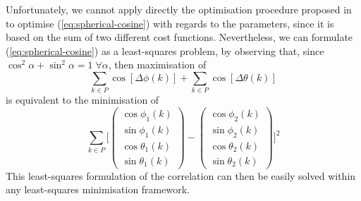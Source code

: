Unfortunately, we cannot apply directly the optimisation procedure proposed in \cite{RefWorks:6} to optimise (\ref{eq:spherical-cosine}) with regards to the parameters, since it is based on the sum of two different cost functions. Nevertheless, we can formulate (\ref{eq:spherical-cosine}) as a least-squares problem, by observing that, since $\cos^2 \alpha + \sin^2 \alpha = 1 \; \forall \alpha$, then maximisation of
\begin{equation}\label{eq:maximise-cos}
   \sum_{k \in P} \cos [\Delta \phi (k)] + \sum_{k \in P} \cos [\Delta \theta (k)]
\end{equation}
is equivalent to the minimisation of
\begin{equation}\label{eq:minimise-least-squares}
       \sum_{k \in P} \Big[ 
        \begin{pmatrix}
            \cos \phi_1 (k) \\ 
            \sin \phi_1 (k) \\
            \cos \theta_1 (k) \\ 
            \sin \theta_1 (k)
        \end{pmatrix}
        -
        \begin{pmatrix}
            \cos \phi_2 (k) \\ 
            \sin \phi_2 (k) \\
            \cos \theta_2 (k) \\ 
            \sin \theta_2 (k)
        \end{pmatrix}
        \Big] ^2
\end{equation}
This least-squares formulation of the correlation can then be easily solved within any least-squares minimisation framework. 

